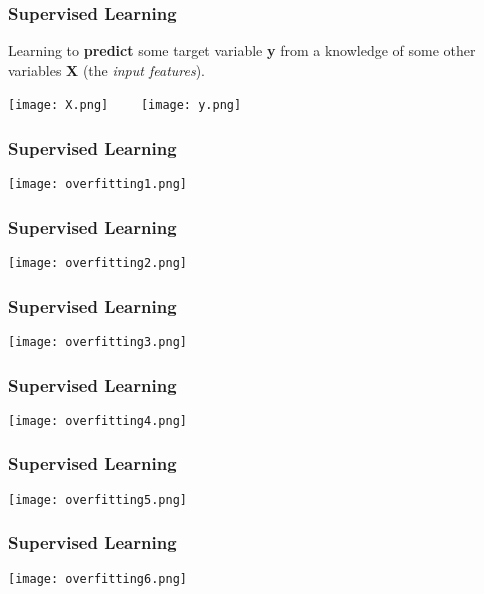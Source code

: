 \documentclass[t]{beamer}
\newcommand\df{\bf\color{Maroon}}
\begin{document}
\begin{frame}
  \frametitle{Supervised Learning}
  Learning to {\df predict} some target variable {\df\large y} from a
  knowledge of some other variables {\df \large X} (the {\it input features}).\pause
  \begin{center}
    \texttt{[image: X.png]}\mbox{~~~~}
    \texttt{[image: y.png]}
  \end{center}
\end{frame}

\begin{frame}
  \frametitle{Supervised Learning}
   \begin{center}
    \texttt{[image: overfitting1.png]}
   \end{center}
\end{frame}

\begin{frame}
  \frametitle{Supervised Learning}
   \begin{center}
    \texttt{[image: overfitting2.png]}
   \end{center}
\end{frame}

\begin{frame}
  \frametitle{Supervised Learning}
   \begin{center}
    \texttt{[image: overfitting3.png]}
   \end{center}
\end{frame}

\begin{frame}
  \frametitle{Supervised Learning}
   \begin{center}
    \texttt{[image: overfitting4.png]}
   \end{center}
\end{frame}

\begin{frame}
  \frametitle{Supervised Learning}
   \begin{center}
    \texttt{[image: overfitting5.png]}
   \end{center}
\end{frame}

\begin{frame}
  \frametitle{Supervised Learning}
   \begin{center}
    \texttt{[image: overfitting6.png]}
   \end{center}
\end{frame}
\end{document}

